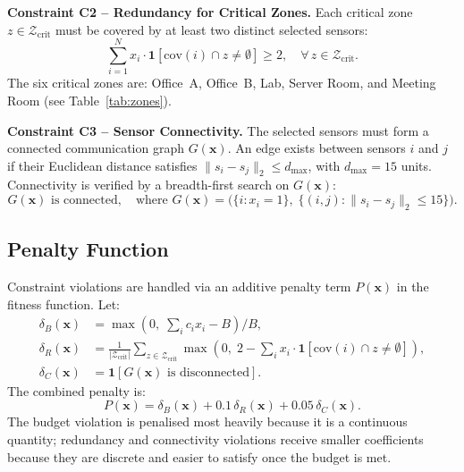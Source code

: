 \documentclass[12pt,a4paper]{article}
\begin{document}
\textbf{Constraint C2 -- Redundancy for Critical Zones.}
Each critical zone $z \in \mathcal{Z}_{\text{crit}}$ must be covered by at least two distinct selected sensors:
\begin{equation}
  \sum_{i=1}^{N} x_i \cdot \mathbf{1}\!\left[\text{cov}(i) \cap z \neq \emptyset\right] \geq 2, \quad \forall\, z \in \mathcal{Z}_{\text{crit}}.
  \label{eq:c2}
\end{equation}
The six critical zones are: Office~A, Office~B, Lab, Server Room, and Meeting Room (see Table~\ref{tab:zones}).

\textbf{Constraint C3 -- Sensor Connectivity.}
The selected sensors must form a connected communication graph $G(\mathbf{x})$.
An edge exists between sensors $i$ and $j$ if their Euclidean distance satisfies $\|s_i - s_j\|_2 \leq d_{\max}$, with $d_{\max} = 15$ units.
Connectivity is verified by a breadth-first search on $G(\mathbf{x})$:
\begin{equation}
  G(\mathbf{x}) \text{ is connected}, \quad \text{where } G(\mathbf{x}) = \bigl(\{i : x_i = 1\},\; \{(i,j) : \|s_i - s_j\|_2 \leq 15\}\bigr).
  \label{eq:c3}
\end{equation}

\subsection{Penalty Function}
\label{sec:penalty}

Constraint violations are handled via an additive penalty term $P(\mathbf{x})$ in the fitness function.
Let:
\begin{align}
  \delta_B(\mathbf{x})   &= \max\!\left(0,\; \sum_{i} c_i x_i - B\right) / B, \label{eq:pen_budget}\\
  \delta_R(\mathbf{x})   &= \frac{1}{|\mathcal{Z}_{\text{crit}}|}\sum_{z \in \mathcal{Z}_{\text{crit}}} \max\!\left(0,\; 2 - \sum_i x_i \cdot \mathbf{1}[\text{cov}(i)\cap z \neq \emptyset]\right), \label{eq:pen_red}\\
  \delta_C(\mathbf{x})   &= \mathbf{1}\!\left[G(\mathbf{x}) \text{ is disconnected}\right]. \label{eq:pen_conn}
\end{align}
The combined penalty is:
\begin{equation}
  P(\mathbf{x}) = \delta_B(\mathbf{x}) + 0.1\,\delta_R(\mathbf{x}) + 0.05\,\delta_C(\mathbf{x}).
  \label{eq:penalty}
\end{equation}
The budget violation is penalised most heavily because it is a continuous quantity; redundancy and connectivity violations receive smaller coefficients because they are discrete and easier to satisfy once the budget is met.
\end{document}
